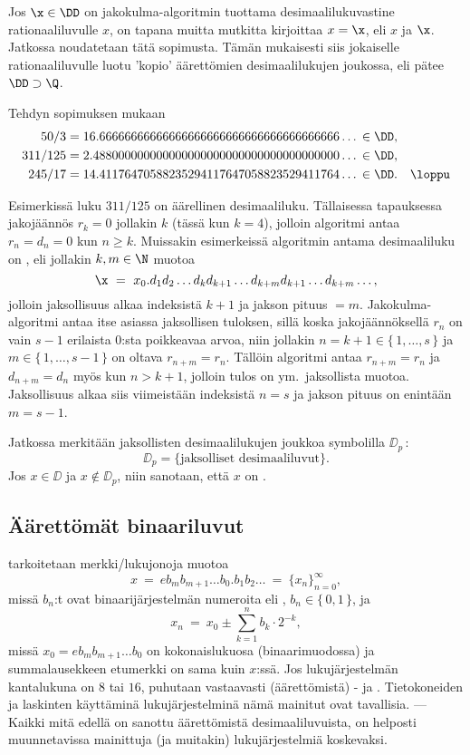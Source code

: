 Jos $\x\in\DD$ on jakokulma-algoritmin tuottama desimaalilukuvastine rationaaliluvulle $x$, on
tapana muitta mutkitta kirjoittaa $x = \x$, eli  $x$ ja $\x$. Jatkossa
noudatetaan tätä sopimusta. Tämän mukaisesti siis jokaiselle rationaaliluvulle luotu 'kopio'
äärettömien desimaalilukujen joukossa, eli pätee $\DD \supset \Q$.
\begin{Exa} Tehdyn sopimuksen mukaan
\begin{align*}
50/3    &= 16.66666666666666666666666666666666666666 \ldots\,\in \DD, \\
311/125 &= 2.488000000000000000000000000000000000000 \ldots\,\in \DD, \\
245/17  &= 14.41176470588235294117647058823529411764 \ldots\,\in \DD. \quad\loppu 
\end{align*} \end{Exa}
Esimerkissä luku $311/125$ on äärellinen desimaaliluku. Tällaisessa tapauksessa jakojäännös
$r_k = 0$ jollakin $k$ (tässä kun $k=4$), jolloin algoritmi antaa $r_n = d_n = 0$ kun $n \ge k$.
%
Muissakin esimerkeissä algoritmin antama desimaaliluku on , eli jollakin
$k,m \in \N$ muotoa
\[
\x\ =\ x_0.d_1 d_2 \ldots d_k d_{k+1} \ldots d_{k+m} d_{k+1} \ldots d_{k+m} \ldots,
\]
jolloin jaksollisuus alkaa indeksistä $k+1$ ja jakson pituus $=m$. Jakokulma-algoritmi antaa 
itse asiassa  jaksollisen tuloksen, sillä koska jakojäännöksellä $r_n$ on vain $s-1$
erilaista $0$:sta poikkeavaa arvoa, niin jollakin $n=k+1\in \{\,1, \ldots,s\,\}$ ja 
$m \in \{\,1, \ldots, s-1\,\}$ on oltava $r_{n+m} = r_{n}$. Tällöin algoritmi antaa 
$r_{n+m} = r_n$ ja $d_{n+m} = d_n$ myös kun $n > k+1$, jolloin tulos on ym.\ jaksollista muotoa.
Jaksollisuus alkaa siis viimeistään indeksistä $n=s$ ja jakson pituus on enintään $m=s-1$. 

Jatkossa merkitään jaksollisten desimaalilukujen joukkoa symbolilla $\DD_p\,$:
\[
\DD_p = \{\text{jaksolliset desimaaliluvut}\}.
\]
%
Jos $x\in\DD$ ja $x\not\in\DD_p$, niin sanotaan, että $x$ on .

\subsection{Äärettömät binaariluvut}
%

 tarkoitetaan merkki/lukujonoja muotoa
\[
x\ =\ eb_m b_{m+1} \ldots b_0 . b_1 b_2 \ldots\ =\ \{x_n\}_{n=0}^{\infty},
\]
%
missä $b_n$:t ovat binaarijärjestelmän numeroita eli , $b_n \in \{\,0,1\,\}$, ja
\[
x_n\ =\ x_0 \pm \sum_{k=1}^n b_k \cdot 2^{-k},
\]
missä $x_0 = e b_m b_{m+1} \ldots b_0$ on kokonaislukuosa (binaarimuodossa) ja summalausekkeen
etumerkki on sama kuin $x$:ssä. Jos lukujärjestelmän kantalukuna on $8$ tai $16$, puhutaan 
vastaavasti (äärettömistä) - ja . Tietokoneiden ja 
laskinten käyttäminä lukujärjestelminä nämä mainitut ovat tavallisia. --- Kaikki mitä edellä
on sanottu äärettömistä desimaaliluvuista, on helposti muunnetavissa mainittuja (ja muitakin)
lukujärjestelmiä koskevaksi.

